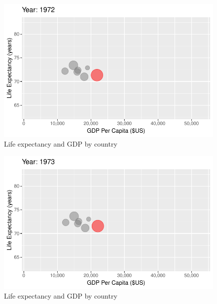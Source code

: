\documentclass[
  letterpaper,
  DIV=11,
  numbers=noendperiod]{scrreport}
\theoremstyle{definition}
\theoremstyle{remark}
\begin{document}
\begin{figure}

{\centering \includegraphics{index_files/figure-pdf/fig-anim-country-37.pdf}

}

\caption{\label{fig-anim-country-37}Life expectancy and GDP by country}

\end{figure}

\begin{figure}

{\centering \includegraphics{index_files/figure-pdf/fig-anim-country-38.pdf}

}

\caption{\label{fig-anim-country-38}Life expectancy and GDP by country}

\end{figure}
\end{document}
